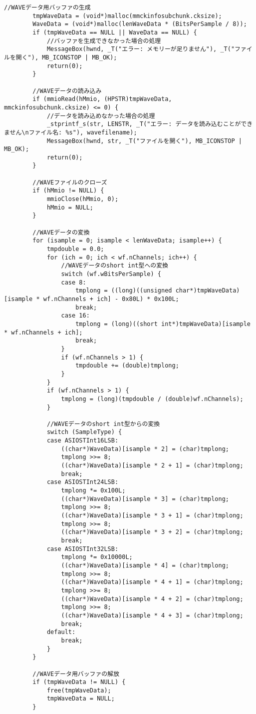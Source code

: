 \begin{lstlisting}[caption=main.cpp]
		//WAVEデータ用バッファの生成
		tmpWaveData = (void*)malloc(mmckinfosubchunk.cksize);
		WaveData = (void*)malloc(lenWaveData * (BitsPerSample / 8));
		if (tmpWaveData == NULL || WaveData == NULL) {
			//バッファを生成できなかった場合の処理
			MessageBox(hwnd, _T("エラー: メモリーが足りません"), _T("ファイルを開く"), MB_ICONSTOP | MB_OK);
			return(0);
		}

		//WAVEデータの読み込み
		if (mmioRead(hMmio, (HPSTR)tmpWaveData, mmckinfosubchunk.cksize) <= 0) {
			//データを読み込めなかった場合の処理
			_stprintf_s(str, LENSTR, _T("エラー: データを読み込むことができません\nファイル名: %s"), wavefilename);
			MessageBox(hwnd, str, _T("ファイルを開く"), MB_ICONSTOP | MB_OK);
			return(0);
		}

		//WAVEファイルのクローズ
		if (hMmio != NULL) {
			mmioClose(hMmio, 0);
			hMmio = NULL;
		}

		//WAVEデータの変換
		for (isample = 0; isample < lenWaveData; isample++) {
			tmpdouble = 0.0;
			for (ich = 0; ich < wf.nChannels; ich++) {
				//WAVEデータのshort int型への変換
				switch (wf.wBitsPerSample) {
				case 8:
					tmplong = ((long)((unsigned char*)tmpWaveData)[isample * wf.nChannels + ich] - 0x80L) * 0x100L;
					break;
				case 16:
					tmplong = (long)((short int*)tmpWaveData)[isample * wf.nChannels + ich];
					break;
				}
				if (wf.nChannels > 1) {
					tmpdouble += (double)tmplong;
				}
			}
			if (wf.nChannels > 1) {
				tmplong = (long)(tmpdouble / (double)wf.nChannels);
			}

			//WAVEデータのshort int型からの変換
			switch (SampleType) {
			case ASIOSTInt16LSB:
				((char*)WaveData)[isample * 2] = (char)tmplong;
				tmplong >>= 8;
				((char*)WaveData)[isample * 2 + 1] = (char)tmplong;
				break;
			case ASIOSTInt24LSB:
				tmplong *= 0x100L;
				((char*)WaveData)[isample * 3] = (char)tmplong;
				tmplong >>= 8;
				((char*)WaveData)[isample * 3 + 1] = (char)tmplong;
				tmplong >>= 8;
				((char*)WaveData)[isample * 3 + 2] = (char)tmplong;
				break;
			case ASIOSTInt32LSB:
				tmplong *= 0x10000L;
				((char*)WaveData)[isample * 4] = (char)tmplong;
				tmplong >>= 8;
				((char*)WaveData)[isample * 4 + 1] = (char)tmplong;
				tmplong >>= 8;
				((char*)WaveData)[isample * 4 + 2] = (char)tmplong;
				tmplong >>= 8;
				((char*)WaveData)[isample * 4 + 3] = (char)tmplong;
				break;
			default:
				break;
			}
		}

		//WAVEデータ用バッファの解放
		if (tmpWaveData != NULL) {
			free(tmpWaveData);
			tmpWaveData = NULL;
		}


\end{lstlisting}
